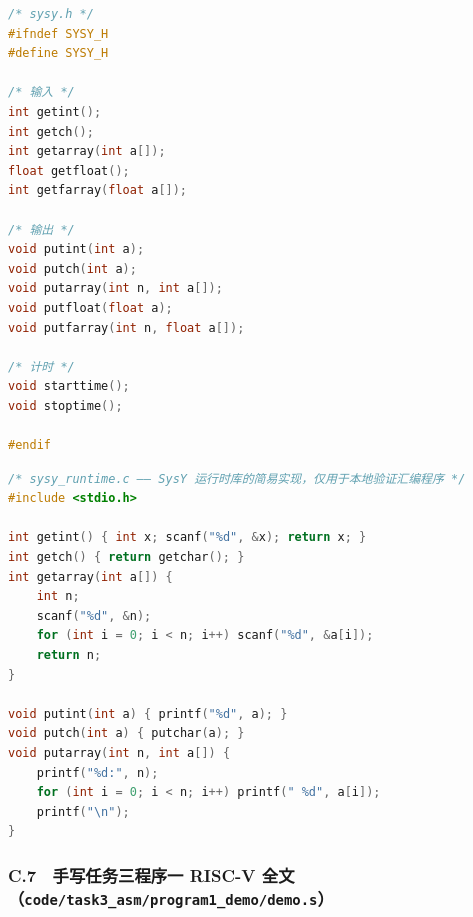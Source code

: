 \documentclass[UTF8,a4paper,10pt]{ctexart}
\begin{document}
\begin{lstlisting}[language=C]
/* sysy.h */
#ifndef SYSY_H
#define SYSY_H

/* 输入 */
int getint();
int getch();
int getarray(int a[]);
float getfloat();
int getfarray(float a[]);

/* 输出 */
void putint(int a);
void putch(int a);
void putarray(int n, int a[]);
void putfloat(float a);
void putfarray(int n, float a[]);

/* 计时 */
void starttime();
void stoptime();

#endif\end{lstlisting}


\begin{lstlisting}[language=C]
/* sysy_runtime.c —— SysY 运行时库的简易实现，仅用于本地验证汇编程序 */
#include <stdio.h>

int getint() { int x; scanf("%d", &x); return x; }
int getch() { return getchar(); }
int getarray(int a[]) {
    int n;
    scanf("%d", &n);
    for (int i = 0; i < n; i++) scanf("%d", &a[i]);
    return n;
}

void putint(int a) { printf("%d", a); }
void putch(int a) { putchar(a); }
void putarray(int n, int a[]) {
    printf("%d:", n);
    for (int i = 0; i < n; i++) printf(" %d", a[i]);
    printf("\n");
}\end{lstlisting}


\subsubsection{C.7　手写任务三程序一 RISC-V 全文（\texttt{code/task3\_asm/program1\_demo/demo.s}）}
\end{document}
